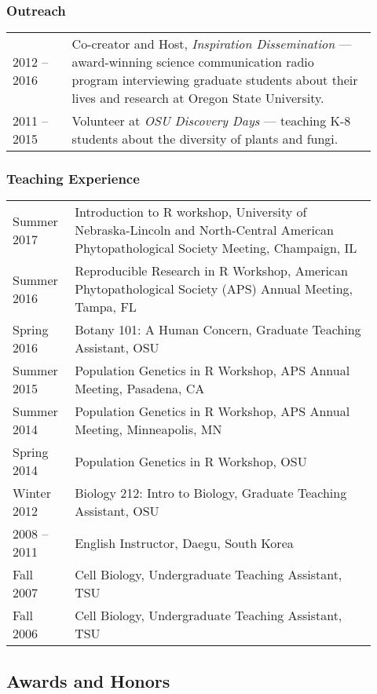 \documentclass[12pt,letterpaper]{article}
\begin{document}
\subsubsection*{Outreach}

\begin{tabular}{p{0.15\linewidth}p{0.775\linewidth}}
2012 -- 2016 & Co-creator and Host, \textit{Inspiration Dissemination} --- 
			   award-winning science communication radio program interviewing 
			   graduate students about their lives and research at Oregon State 
			   University.\\
2011 -- 2015 & Volunteer at \textit{OSU Discovery Days} --- teaching K-8 students
               about the diversity of plants and fungi.
\end{tabular}

\subsubsection*{Teaching Experience}

\begin{tabular}{p{0.15\linewidth}p{0.775\linewidth}}
Summer 2017  & Introduction to R workshop, University of Nebraska-Lincoln and 
			   North-Central American Phytopathological Society Meeting,
			   Champaign, IL\\
Summer 2016  & Reproducible Research in R Workshop, American Phytopathological 
			   Society (APS) Annual Meeting, Tampa, FL\\
Spring 2016  & Botany 101: A Human Concern, Graduate Teaching Assistant, OSU\\
Summer 2015  & Population Genetics in R Workshop, APS Annual Meeting, Pasadena, CA\\
Summer 2014  & Population Genetics in R Workshop, APS Annual Meeting, Minneapolis, MN\\
Spring 2014  & Population Genetics in R Workshop, OSU\\
Winter 2012  & Biology 212: Intro to Biology, Graduate Teaching Assistant, OSU\\
2008 -- 2011 & English Instructor, Daegu, South Korea\\
Fall 2007    & Cell Biology, Undergraduate Teaching Assistant, TSU\\
Fall 2006    & Cell Biology, Undergraduate Teaching Assistant, TSU
\end{tabular}


\subsection*{Awards and Honors}
\end{document}
